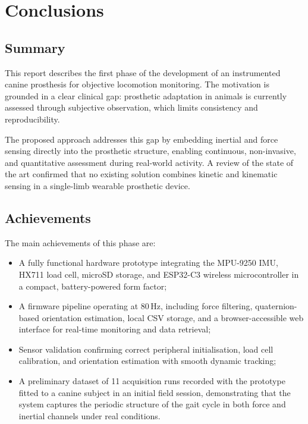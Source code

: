 \chapter{Conclusions}
\label{chapter:conclusions}

\section{Summary}

This report describes the first phase of the development of an instrumented
canine prosthesis for objective locomotion monitoring.
The motivation is grounded in a clear clinical gap: prosthetic adaptation in
animals is currently assessed through subjective observation, which limits
consistency and reproducibility.

The proposed approach addresses this gap by embedding inertial and force
sensing directly into the prosthetic structure, enabling continuous,
non-invasive, and quantitative assessment during real-world activity.
A review of the state of the art confirmed that no existing solution combines
kinetic and kinematic sensing in a single-limb wearable prosthetic device.

\section{Achievements}

The main achievements of this phase are:

\begin{itemize}
  \item A fully functional hardware prototype integrating the MPU-9250 IMU,
        HX711 load cell, microSD storage, and ESP32-C3 wireless
        microcontroller in a compact, battery-powered form factor;
  \item A firmware pipeline operating at 80\,Hz, including force filtering,
        quaternion-based orientation estimation, local CSV storage, and a
        browser-accessible web interface for real-time monitoring and data
        retrieval;
  \item Sensor validation confirming correct peripheral initialisation, load
        cell calibration, and orientation estimation with smooth dynamic
        tracking;
  \item A preliminary dataset of 11 acquisition runs recorded with the
        prototype fitted to a canine subject in an initial field session,
        demonstrating that the system captures the periodic structure of
        the gait cycle in both force and inertial channels under real conditions.
\end{itemize}

